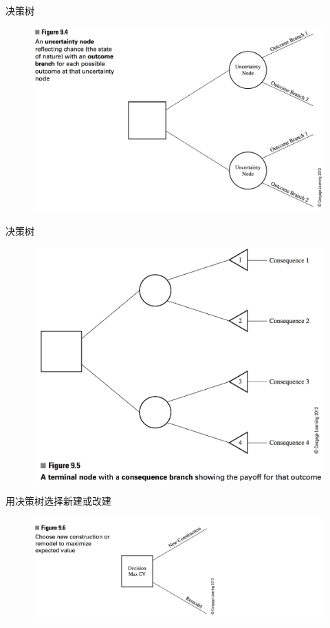 \documentclass[mathserif, table]{beamer}
\begin{document}
\begin{frame}{决策树}
  
  \begin{figure}
    \centering
    \includegraphics[width=\textwidth{}]{9_4.png}
  \end{figure}
  
\end{frame}

\begin{frame}{决策树}
  
  \begin{figure}
    \centering
    \includegraphics[width=0.8\textwidth{}]{9_5.png}
  \end{figure}
  
\end{frame}

\begin{frame}{用决策树选择新建或改建}
  
  \begin{figure}
    \centering
    \includegraphics[width=\textwidth{}]{9_6.png}
  \end{figure}

\end{frame}
\end{document}
